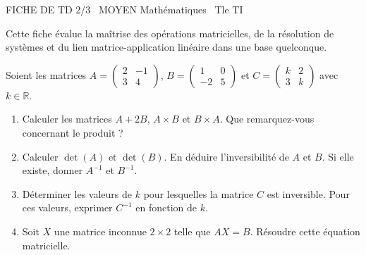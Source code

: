 \documentclass[11pt]{article}
\begin{document}
\begin{tcolorbox}[enhanced,colback=popink,colframe=popink,arc=10pt,boxrule=0pt,left=12pt,right=12pt,top=9pt,bottom=9pt]
{\color{white}\popxbold\small FICHE DE TD 2/3 \textbullet\ MOYEN \hfill Mathématiques \textbullet\ Tle TI\par}
\end{tcolorbox}
\vspace{4pt}
Cette fiche évalue la maîtrise des opérations matricielles, de la résolution de systèmes et du lien matrice-application linéaire dans une base quelconque.

\begin{exercice}
Soient les matrices $A = \begin{pmatrix} 2 & -1 \\ 3 & 4 \end{pmatrix}$, $B = \begin{pmatrix} 1 & 0 \\ -2 & 5 \end{pmatrix}$ et $C = \begin{pmatrix} k & 2 \\ 3 & k \end{pmatrix}$ avec $k \in \mathbb{R}$.
\begin{enumerate}
    \item Calculer les matrices $A + 2B$, $A \times B$ et $B \times A$. Que remarquez-vous concernant le produit ?
    \item Calculer $\det(A)$ et $\det(B)$. En déduire l'inversibilité de $A$ et $B$. Si elle existe, donner $A^{-1}$ et $B^{-1}$.
    \item Déterminer les valeurs de $k$ pour lesquelles la matrice $C$ est inversible. Pour ces valeurs, exprimer $C^{-1}$ en fonction de $k$.
    \item Soit $X$ une matrice inconnue $2 \times 2$ telle que $AX = B$. Résoudre cette équation matricielle.
\end{enumerate}
\end{exercice}
\end{document}
